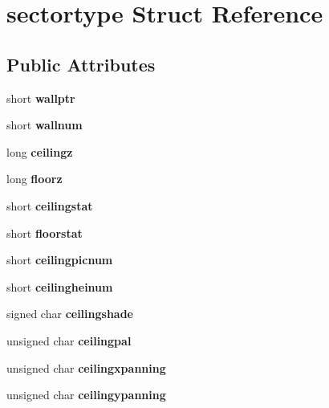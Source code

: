 \section{sectortype Struct Reference}
\label{structsectortype}
\subsection*{Public Attributes}
\begin{DoxyCompactItemize}
\item 
short {\bfseries wallptr}\label{structsectortype_a8d2c5b2b03b6f140faf295c1e22a088a}

\item 
short {\bfseries wallnum}\label{structsectortype_a87e6c99fd043838cd3d040e8a0ca52f5}

\item 
long {\bfseries ceilingz}\label{structsectortype_ae83941cd28376684f512f6248664b8bc}

\item 
long {\bfseries floorz}\label{structsectortype_ae4606912ed962b8fc2529f0683489256}

\item 
short {\bfseries ceilingstat}\label{structsectortype_acc2f2600a1bb5bfd7a85d564a23778d8}

\item 
short {\bfseries floorstat}\label{structsectortype_aa49508f2a8677036936ce5e8b8a2ebc8}

\item 
short {\bfseries ceilingpicnum}\label{structsectortype_a4cda7c47200f5e2ad0fbf7a8931ac0f4}

\item 
short {\bfseries ceilingheinum}\label{structsectortype_a73a9add3009fb007cd219d8d74279a0c}

\item 
signed char {\bfseries ceilingshade}\label{structsectortype_a744868a0c310f627812f6ace1d9e31a6}

\item 
unsigned char {\bfseries ceilingpal}\label{structsectortype_a5d5a9ba01f895680d788e933afd090e7}

\item 
unsigned char {\bfseries ceilingxpanning}\label{structsectortype_abe28d83b6601327c43d6500ae0aea3c9}

\item 
unsigned char {\bfseries ceilingypanning}\label{structsectortype_a309d849af4c1f27f1e241f720fe36abe}


\end{DoxyCompactItemize}
